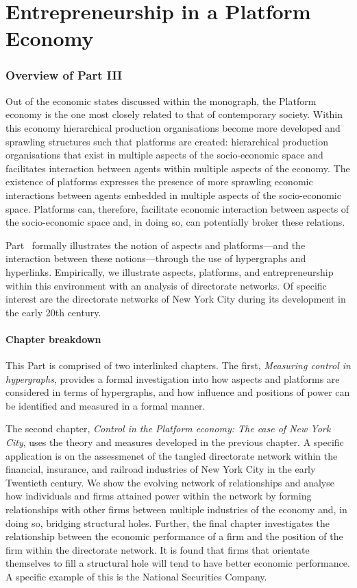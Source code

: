 \part{Entrepreneurship in a Platform Economy} 
\label{part:entrepreneurshipPlatformEconomy}

\section*{Overview of Part III}

Out of the economic states discussed within the monograph, the Platform economy is the one most closely related to that of contemporary society. Within this economy hierarchical production organisations become more developed and sprawling structures such that platforms are created: hierarchical production organisations that exist in multiple aspects of the socio-economic space and facilitates interaction between agents within multiple aspects of the economy. The existence of platforms expresses the presence of more sprawling economic interactions between agents embedded in multiple aspects of the socio-economic space. Platforms can, therefore, facilitate economic interaction between aspects of the socio-economic space and, in doing so, can potentially broker these relations.

Part~\ref{part:entrepreneurshipPlatformEconomy} formally illustrates the notion of aspects and platforms---and the interaction between these notions---through the use of hypergraphs and hyperlinks. Empirically, we illustrate aspects, platforms, and entrepreneurship within this environment with an analysis of directorate networks. Of specific interest are the directorate networks of New York City during its development in the early 20th century.

\subsection*{Chapter breakdown}

This Part is comprised of two interlinked chapters. The first, \emph{Measuring control in hypergraphs}, provides a formal investigation into how aspects and platforms are considered in terms of hypergraphs, and how influence and positions of power can be identified and measured in a formal manner.

The second chapter, \emph{Control in the Platform economy: The case of New York City}, uses the theory and measures developed in the previous chapter. A specific application is on the assessmenet of the tangled directorate network within the financial, insurance, and railroad industries of New York City in the early Twentieth century. We show the evolving network of relationships and analyse how individuals and firms attained power within the network by forming relationships with other firms between multiple industries of the economy and, in doing so, bridging structural holes. Further, the final chapter investigates the relationship between the economic performance of a firm and the position of the firm within the directorate network. It is found that firms that orientate themselves to fill a structural hole will tend to have better economic performance. A specific example of this is the National Securities Company.